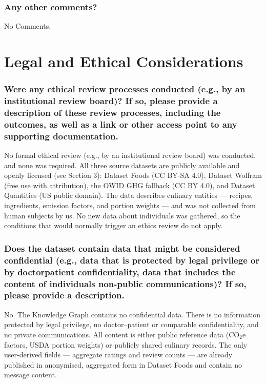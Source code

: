 \documentclass{article}
\newcommand{\question}[1]{#1}
\begin{document}
\question{\subsubsection*{Any other comments?}}
No Comments.

\section{Legal and Ethical Considerations}

\question{\subsubsection*{Were any ethical review processes conducted (e.g., by an institutional review board)? If so, please provide a description of these review
processes, including the outcomes, as well as a link or other access point
to any supporting documentation.}}

No formal ethical review (e.g., by an institutional review board) was conducted, and none was required. All three source datasets are publicly available and openly licensed (see Section 3): Dataset Foods (CC BY-SA 4.0), Dataset Wolfram (free use with attribution), the OWID GHG fallback (CC BY 4.0), and Dataset Quantities (US public domain). The data describes culinary entities --- recipes, ingredients, emission factors, and portion weights --- and was not collected from human subjects by us. No new data about individuals was gathered, so the conditions that would normally trigger an ethics review do not apply.

\question{\subsubsection*{Does the dataset contain data that might be considered confidential
(e.g., data that is protected by legal privilege or by doctorpatient confidentiality, data that includes the content of individuals non-public
communications)? If so, please provide a description.}}

No. The Knowledge Graph contains no confidential data. There is no information protected by legal privilege, no doctor--patient or comparable confidentiality, and no private communications. All content is either public reference data (CO$_2$e factors, USDA portion weights) or publicly shared culinary records. The only user-derived fields --- aggregate ratings and review counts --- are already published in anonymised, aggregated form in Dataset Foods and contain no message content.
\end{document}
